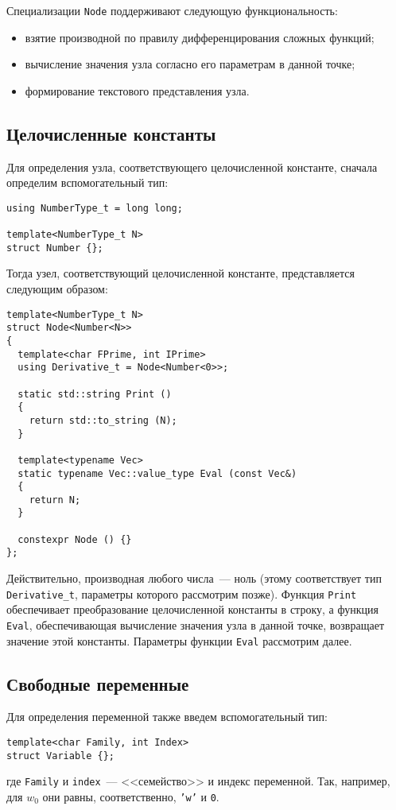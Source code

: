 \documentclass[11pt,a4paper]{article}
\begin{document}
Специализации \texttt{Node} поддерживают следующую функциональность:
\begin{itemize}
  \item взятие производной по правилу дифференцирования сложных функций;
  \item вычисление значения узла согласно его параметрам в данной точке;
  \item формирование текстового представления узла.
\end{itemize}

\subsection{Целочисленные константы}
Для определения узла, соответствующего целочисленной константе, сначала определим
вспомогательный тип:
\begin{lstlisting}
using NumberType_t = long long;

template<NumberType_t N>
struct Number {};
\end{lstlisting}

Тогда узел, соответствующий целочисленной константе, представляется следующим образом:
\begin{lstlisting}
template<NumberType_t N>
struct Node<Number<N>>
{
  template<char FPrime, int IPrime>
  using Derivative_t = Node<Number<0>>;

  static std::string Print ()
  {
    return std::to_string (N);
  }

  template<typename Vec>
  static typename Vec::value_type Eval (const Vec&)
  {
    return N;
  }

  constexpr Node () {}
};
\end{lstlisting}

Действительно, производная любого числа~--- ноль (этому соответствует тип \texttt{Derivative\_t},
параметры которого рассмотрим позже). Функция \texttt{Print} обеспечивает преобразование
целочисленной константы в строку, а функция \texttt{Eval}, обеспечивающая вычисление
значения узла в данной точке, возвращает значение этой константы. Параметры функции
\texttt{Eval} рассмотрим далее.

\subsection{Свободные переменные}

Для определения переменной также введем вспомогательный тип:
\begin{lstlisting}
template<char Family, int Index>
struct Variable {};
\end{lstlisting}
где \texttt{Family} и \texttt{index}~--- <<семейство>> и индекс переменной. Так, например,
для $w_0$ они равны, соответственно, \texttt{'w'} и \texttt{0}.
\end{document}
